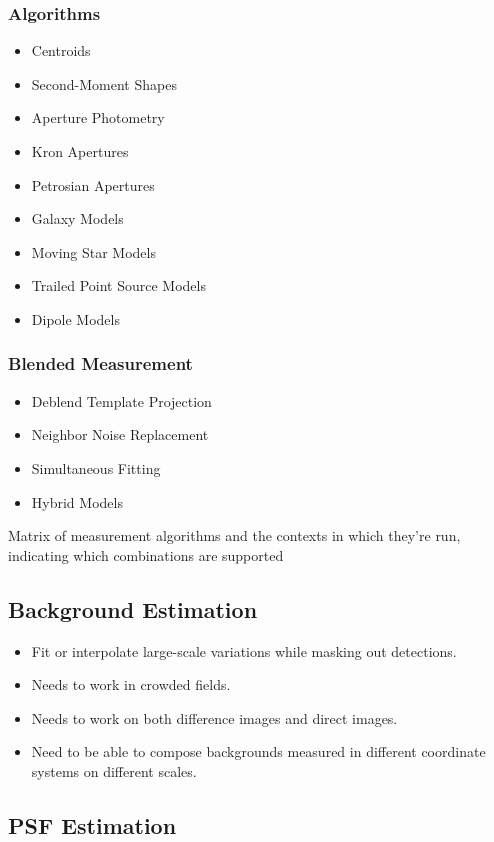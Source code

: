 \subsubsection{Algorithms}
\begin{itemize}
\item Centroids
\item Second-Moment Shapes
\item Aperture Photometry
\item Kron Apertures
\item Petrosian Apertures
\item Galaxy Models
\item Moving Star Models
\item Trailed Point Source Models
\item Dipole Models
\end{itemize}
\subsubsection{Blended Measurement}
\begin{itemize}
\item Deblend Template Projection
\item Neighbor Noise Replacement
\item Simultaneous Fitting
\item Hybrid Models
\end{itemize}

\begin{note}
Matrix of measurement algorithms and the contexts in which they're run, indicating which combinations are supported
\end{note}

\subsection{Background Estimation}
\begin{itemize}
\item Fit or interpolate large-scale variations while masking out detections.
\item Needs to work in crowded fields.
\item Needs to work on both difference images and direct images.
\item Need to be able to compose backgrounds measured in different coordinate systems on different scales.
\end{itemize}

\subsection{PSF Estimation}
